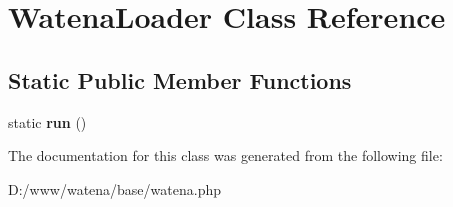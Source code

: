 \hypertarget{class_watena_loader}{\section{Watena\-Loader Class Reference}
\label{class_watena_loader}
}
\subsection*{Static Public Member Functions}
\begin{DoxyCompactItemize}
\item 
\hypertarget{class_watena_loader_abc5c1c862c066d2283fb517327cf7c32}{static {\bfseries run} ()}\label{class_watena_loader_abc5c1c862c066d2283fb517327cf7c32}

\end{DoxyCompactItemize}


The documentation for this class was generated from the following file\-:\begin{DoxyCompactItemize}
\item 
D\-:/www/watena/base/watena.\-php\end{DoxyCompactItemize}
